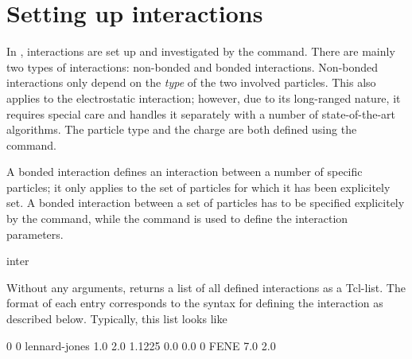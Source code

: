 %  
%   
%  
%  
%
\chapter{Setting up interactions}
\label{sec:inter}

In \es, interactions are set up and investigated by the
 command. There are mainly two types of interactions:
non-bonded and bonded interactions. Non-bonded interactions only
depend on the \emph{type} of the two involved particles. This also
applies to the electrostatic interaction; however, due to its
long-ranged nature, it requires special care and \es handles it
separately with a number of state-of-the-art algorithms. The particle
type and the charge are both defined using the  command.

A bonded interaction defines an interaction between a number of
specific particles; it only applies to the set of particles for which
it has been explicitely set.  A bonded interaction between a set of
particles has to be specified explicitely by the 
command, while the  command is used to define the
interaction parameters.

\begin{essyntax}
  inter
\end{essyntax}
Without any arguments,  returns a list of all defined
interactions as a Tcl-list. The format of each entry corresponds to
the syntax for defining the interaction as described below. Typically,
this list looks like
\begin{tclcode}
  {0 0 lennard-jones 1.0 2.0 1.1225 0.0 0.0} {0 FENE 7.0 2.0}
\end{tclcode}


